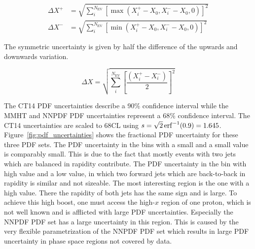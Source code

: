 \begin{equation*}
\begin{aligned}
\Delta X^+ &= \sqrt{\sum_i^{N_{\mathrm{EV}}} \left[ \max(X_i^+ -X_0, X_i^- - X_0, 0)\right]^2}\\
\Delta X^- &= \sqrt{\sum_i^{N_{\mathrm{EV}}} \left[ \min(X_i^+ -X_0, X_i^- - X_0,0)\right]^2}
\end{aligned}
\end{equation*}

The symmetric uncertainty is given by half the difference of the upwards and
downwards variation.

\begin{equation*}
    \Delta X = \sqrt{\sum_i^{N_{\mathrm{EV}}} \left[ \frac{\left( X_i^+ -
    X_i^-\right)}{2} \right]^2}
\end{equation*}

The CT14 PDF uncertainties describe a 90\% confidence interval while the MMHT
and NNPDF PDF uncertainties represent a 68\% confidence interval. The CT14
uncertainties are scaled to 68CL using $s = \sqrt{2} \operatorname{erf}^{-1}(0.9) = 1.645$.
Figure~\ref{fig:pdf_uncertainties} shows the fractional PDF uncertainty for
these three PDF sets. The PDF uncertainty in the bins with a small \ystar and a
small \yboost value is comparably small. This is due to the fact that mostly
events with two jets which are balanced in rapidity contribute. The PDF
uncertainty in the bin with high \ystar value and a low \yboost value, in which
two forward jets which are back-to-back in rapidity is similar and not sizeable.
The most interesting region is the one with a high \yboost value. There the
rapidity of both jets has the same sign and is large. To achieve this high boost, one
must access the high-$x$ region of one proton, which is not well known and is
afflicted with large PDF uncertainties. Especially the NNPDF PDF set has a large
uncertainty in this region. This is caused by the very flexible parametrization
of the NNPDF PDF set which results in large PDF uncertainty in phase space
regions not covered by data.

